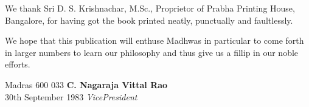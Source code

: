 We thank Sri D. S. Krishnachar, M.Sc., Proprietor of Prabha Printing House, Bangalore, for having got the book printed neatly, punctually and faultlessly.

We hope that this publication will enthuse Madhwas in particular to come forth in larger numbers to learn our philosophy and thus give us a fillip in our noble efforts.

\vskip 1cm

\noindent
Madras 600 033 \hfill \textbf{C. Nagaraja Vittal Rao}\\ 30th September 1983 \hfill \textit{Vice\enginline{-}President}

